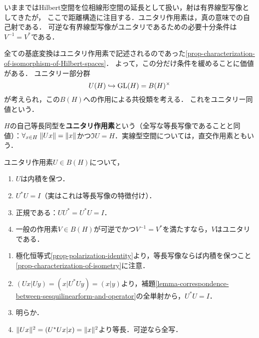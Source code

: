 \documentclass[uplatex,dvipdfmx]{jsreport}
\begin{document}
\begin{tcolorbox}[colframe=ForestGreen, colback=ForestGreen!10!white,breakable,colbacktitle=ForestGreen!40!white,coltitle=black,fonttitle=\bfseries\sffamily,
title=ユニタリ作用素]
    いままではHilbert空間を位相線形空間の延長として扱い，射は有界線型写像としてきたが，
    ここで距離構造に注目する．ユニタリ作用素は，真の意味での自己射である．
    可逆な有界線型写像がユニタリであるための必要十分条件は$V^{-1}=V^*$である．

    全ての基底変換はユニタリ作用素で記述されるのであった\ref{prop-characterization-of-isomorphism-of-Hilbert-spaces}．
    よって，この分だけ条件を緩めることに価値がある．
    ユニタリー部分群
    \[U(H)\hookrightarrow\mathrm{GL}(H)=B(H)^\times\]
    が考えられ，この$B(H)$への作用による共役類を考える．
    これをユニタリー同値という．
\end{tcolorbox}

\begin{definition}
    $H$の自己等長同型を\textbf{ユニタリ作用素}という（全写な等長写像であることと同値）：$\forall_{x\in H}\;\|Ux\|=\|x\|$かつ$\Im U=H$．実線型空間については，直交作用素ともいう．
\end{definition}

\begin{lemma}[ユニタリ作用素の特徴付け]\label{lemma-characterization-of-unitary-operator}
    ユニタリ作用素$U\in B(H)$について，
    \begin{enumerate}
        \item $U$は内積を保つ．
        \item $U^*U=I$（実はこれは等長写像の特徴付け）．
        \item 正規である：$UU^*=U^*U=I$．
        \item 一般の作用素$V\in B(H)$が可逆でかつ$V^{-1}=V^*$を満たすなら，$V$はユニタリである．
    \end{enumerate}
\end{lemma}
\begin{Proof}\mbox{}
    \begin{enumerate}
        \item 極化恒等式\ref{prop-polarization-identity}より，等長写像ならば内積を保つこと\ref{prop-characterization-of-isometry}に注意．
        \item $(Ux|Uy)=(x|U^*Uy)=(x|y)$より，補題\ref{lemma-correspondence-between-sesquilinearform-and-operator}の全単射から，$U^*U=I$．
        \item 明らか．
        \item $\|Ux\|^2=(U^*Ux|x)=\|x\|^2$より等長．可逆なら全写．
    \end{enumerate}
\end{Proof}
\end{document}
